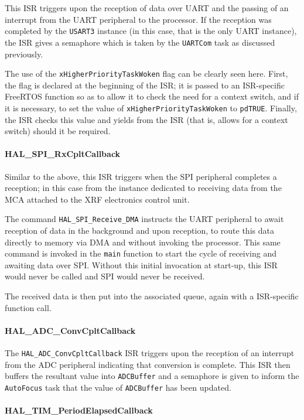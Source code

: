 This ISR triggers upon the reception of data over UART and the passing of an interrupt from the UART peripheral to the processor. If the reception was completed by the \verb|USART3| instance (in this case, that is the only UART instance), the ISR gives a semaphore which is taken by the \verb|UARTCom| task as discussed previously.

The use of the \verb|xHigherPriorityTaskWoken| flag can be clearly seen here. First, the flag is declared at the beginning of the ISR; it is passed to an ISR-specific FreeRTOS function so as to allow it to check the need for a context switch, and if it is necessary, to set the value of \verb|xHigherPriorityTaskWoken| to \verb|pdTRUE|. Finally, the ISR checks this value and yields from the ISR (that is, allows for a context switch) should it be required.

\paragraph{HAL\_SPI\_RxCpltCallback}

Similar to the above, this ISR triggers when the SPI peripheral completes a reception; in this case from the instance dedicated to receiving data from the MCA attached to the XRF electronics control unit.

The command \verb|HAL_SPI_Receive_DMA| instructs the UART peripheral to await reception of data in the background and upon reception, to route this data directly to memory via DMA and without invoking the processor. This same command is invoked in the \verb|main| function to start the cycle of receiving and awaiting data over SPI. Without this initial invocation at start-up, this ISR would never be called and SPI would never be received.

The received data is then put into the associated queue, again with a ISR-specific function call.

\paragraph{HAL\_ADC\_ConvCpltCallback}

The \verb|HAL_ADC_ConvCpltCallback| ISR triggers upon the reception of an interrupt from the ADC peripheral indicating that conversion is complete. This ISR then buffers the resultant value into \verb|ADCBuffer| and a semaphore is given to inform the \verb|AutoFocus| task that the value of \verb|ADCBuffer| has been updated.

\paragraph{HAL\_TIM\_PeriodElapsedCallback}

